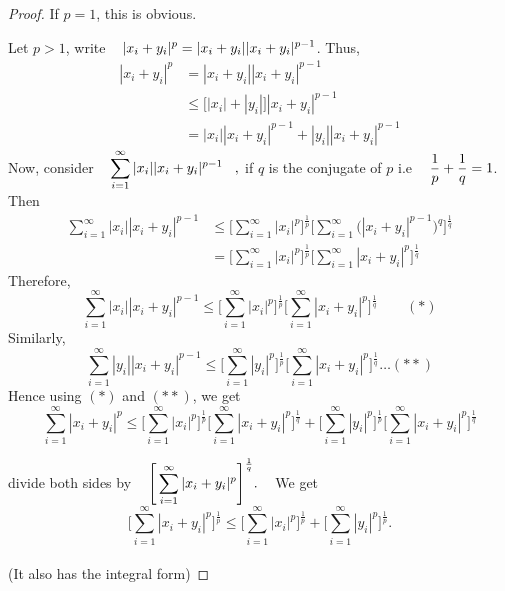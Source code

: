 \documentclass[11pt,a4paper]{article}
\theoremstyle{definition}
\begin{document}
\begin{proof}
If $p=1$, this is obvious.

Let $p>1$, write $\hspace{0.3cm}\displaystyle{|x_i+y_i|^p=|x_i+y_i||x_i+y_i|^{p-1}}$.\hspace{0.3cm} Thus,
\begin{align*}
|x_i+y_i|^p &=|x_i+y_i||x_i+y_i|^{p-1}\\
            &\leq \Big[|x_i|+|y_i|\Big]|x_i+y_i|^{p-1}\\
            &=|x_i||x_i+y_i|^{p-1}+|y_i||x_i+y_i|^{p-1}
\end{align*}
Now, consider $\hspace{0.3cm}\displaystyle{\sum^{\infty}_{i=1}|x_i||x_i+y_i|^{p-1}}\hspace{0.3cm},$ if $q$ is the conjugate of $p$\hspace{0.2cm} i.e $\hspace{0.3cm}\dfrac{1}{p}+\dfrac{1}{q}=1$.
Then
\begin{align*}
\sum^{\infty}_{i=1}|x_i||x_i+y_i|^{p-1} &\leq \Bigg[\sum^{\infty}_{i=1}|x_i|^p\Bigg]^{\frac{1}{p}} \Bigg[\sum^{\infty}_{i=1}\Big(|x_i+y_i|^{p-1}\Big)^q\Bigg]^{\frac{1}{q}}\\
                                        &=\Bigg[\sum^{\infty}_{i=1}|x_i|^p\Bigg]^{\frac{1}{p}}\Bigg[\sum^{\infty}_{i=1}|x_i+y_i|^p\Bigg]^{\frac{1}{q}}
\end{align*}
Therefore, $$\sum^{\infty}_{i=1}|x_i||x_i+y_i|^{p-1}\leq \Bigg[\sum^{\infty}_{i=1}|x_i|^p\Bigg]^{\frac{1}{p}}\Bigg[\sum^{\infty}_{i=1}|x_i+y_i|^p\Bigg]^{\frac{1}{q}}\qquad (*)$$ Similarly, $$\sum^{\infty}_{i=1}|y_i||x_i+y_i|^{p-1}\leq \Bigg[\sum^{\infty}_{i=1}|y_i|^p\Bigg]^{\frac{1}{p}}\Bigg[\sum^{\infty}_{i=1}|x_i+y_i|^p\Bigg]^{\frac{1}{q}}\dots(**)$$ Hence using $(*)$ and $(**)$, we get $$\sum^{\infty}_{i=1}|x_i+y_i|^p\leq \Bigg[\sum^{\infty}_{i=1}|x_i|^p\Bigg]^{\frac{1}{p}}\Bigg[\sum^{\infty}_{i=1}|x_i+y_i|^p\Bigg]^{\frac{1}{q}}+\Bigg[\sum^{\infty}_{i=1}|y_i|^p\Bigg]^{\frac{1}{p}}\Bigg[\sum^{\infty}_{i=1}|x_i+y_i|^p\Bigg]^{\frac{1}{q}}$$

divide both sides by $\hspace{0.3cm}\displaystyle{\Bigg[\sum^{\infty}_{i=1}|x_i+y_i|^p\Bigg]^{\frac{1}{q}}}.\hspace{0.3cm}$ We get $$\Bigg[\sum^{\infty}_{i=1}|x_i+y_i|^p\Bigg]^{\frac{1}{p}}\leq \Bigg[\sum^{\infty}_{i=1}|x_i|^p\Bigg]^{\frac{1}{p}}+\Bigg[\sum^{\infty}_{i=1}|y_i|^p\Bigg]^{\frac{1}{p}}.$$\\
(It also has the integral form)

\end{proof}
\end{document}
